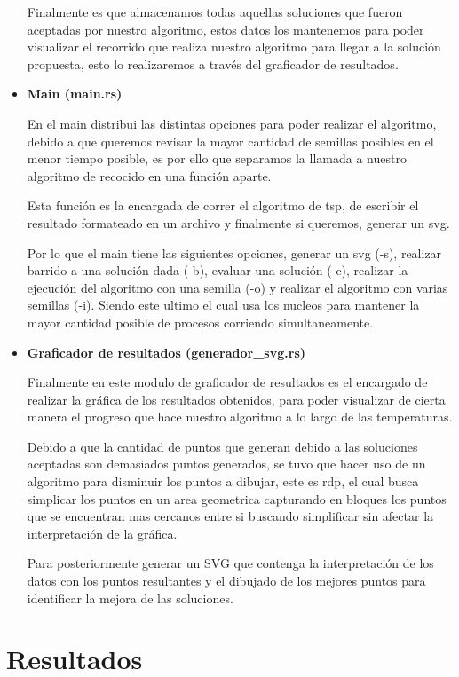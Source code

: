 \begin{multicols}{2}
\begin{itemize}
  Finalmente es que almacenamos todas aquellas soluciones que fueron aceptadas por nuestro algoritmo, estos datos los mantenemos para poder visualizar el recorrido que realiza nuestro algoritmo para llegar a la solución propuesta, esto lo realizaremos a través del graficador de resultados.
  
\item \textbf{Main (main.rs)}

  En el main distribui las distintas opciones para poder realizar el algoritmo, debido a que queremos revisar la mayor cantidad de semillas posibles en el menor tiempo posible, es por ello que separamos la llamada a nuestro algoritmo de recocido en una función aparte.

  Esta función es la encargada de correr el algoritmo de tsp, de escribir el resultado formateado en un archivo y finalmente si queremos, generar un svg.

  Por lo que el main tiene las siguientes opciones, generar un svg (-s), realizar barrido a una solución dada (-b), evaluar una solución (-e), realizar la ejecución del algoritmo con una semilla (-o) y realizar el algoritmo con varias semillas (-i). Siendo este ultimo el cual usa los nucleos para mantener la mayor cantidad posible de procesos corriendo simultaneamente.

\item \textbf{Graficador de resultados (generador\_svg.rs)}

  Finalmente en este modulo de graficador de resultados es el encargado de realizar la gráfica de los resultados obtenidos, para poder visualizar de cierta manera el progreso que hace nuestro algoritmo a lo largo de las temperaturas.

  Debido a que la cantidad de puntos que generan debido a las soluciones aceptadas son demasiados puntos generados, se tuvo que hacer uso de un algoritmo para disminuir los puntos a dibujar, este es rdp, el cual busca simplicar los puntos en un area geometrica capturando en bloques los puntos que se encuentran mas cercanos entre si buscando simplificar sin afectar la interpretación de la gráfica.

  Para posteriormente generar un SVG que contenga la interpretación de los datos con los puntos resultantes y el dibujado de los mejores puntos para identificar la mejora de las soluciones. 
  
\end{itemize}

\section{Resultados}


\end{multicols}
